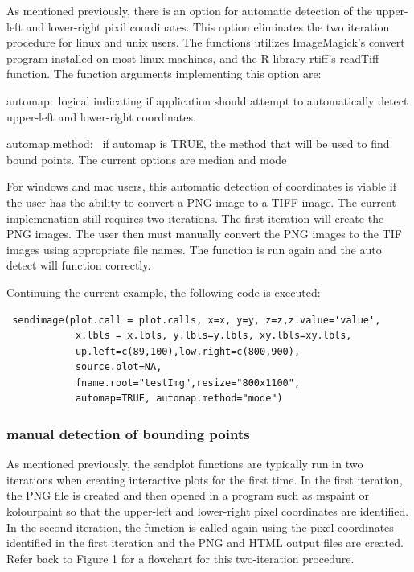 \documentclass[]{article}
\begin{document}
\indent As mentioned previously, there is an option for automatic detection of the upper-left and lower-right pixil coordinates. This option eliminates the two iteration procedure for linux and unix users. The functions utilizes ImageMagick's convert program installed on most linux machines, and the R library rtiff's readTiff function. The function arguments implementing this option are:
\begin{description}
 \item{automap:~}{logical indicating if application should
    attempt to automatically detect upper-left and lower-right 
    coordinates.}

  \item{automap.method:~ }{if automap is TRUE, the method that will be
    used to find bound points. The current options are median and mode}

 \end{description}

\indent For windows and mac users, this automatic detection of coordinates is viable if the user has the ability to convert a PNG image to a TIFF image. The current implemenation still requires two iterations. The first iteration will create the PNG images. The user then must manually convert the PNG images to the TIF images using appropriate file names. The function is run again and the auto detect will function correctly.  

\indent Continuing the current example, the following code is executed:
\begin{verbatim}
 sendimage(plot.call = plot.calls, x=x, y=y, z=z,z.value='value',
            x.lbls = x.lbls, y.lbls=y.lbls, xy.lbls=xy.lbls,
            up.left=c(89,100),low.right=c(800,900),
            source.plot=NA,
            fname.root="testImg",resize="800x1100",
            automap=TRUE, automap.method="mode")
\end{verbatim}


\subsubsection{manual detection of bounding points}

\indent As mentioned previously, the sendplot functions are typically run in two iterations when creating interactive plots for the first time. In the first iteration, the PNG file is created and then opened in a program such as mspaint or kolourpaint so that the upper-left and lower-right pixel coordinates are identified. In the second iteration, the function is called again using the pixel coordinates identified in the first iteration and the PNG and HTML output files are created.  Refer back to Figure 1 for a flowchart for this two-iteration procedure. 
\end{document}
